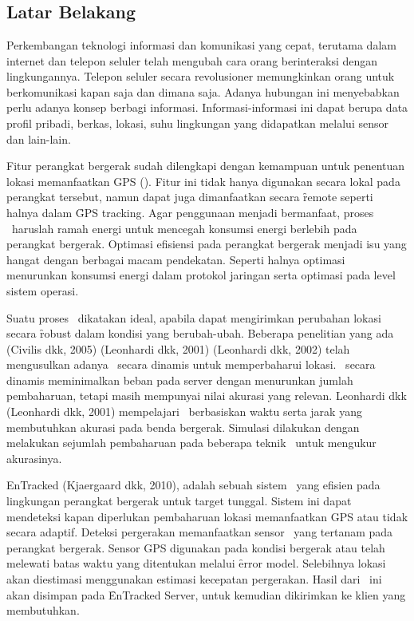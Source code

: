 \chapter{\babSatu}

\section{Latar Belakang}

Perkembangan teknologi informasi dan komunikasi yang cepat, terutama dalam
internet dan telepon seluler telah mengubah cara orang berinteraksi dengan
lingkungannya.  Telepon seluler secara revolusioner memungkinkan orang untuk
berkomunikasi kapan saja dan dimana saja. Adanya hubungan ini menyebabkan perlu
adanya konsep berbagi informasi. Informasi-informasi ini dapat berupa data
profil pribadi, berkas, lokasi, suhu lingkungan yang didapatkan melalui sensor
dan lain-lain.

Fitur perangkat bergerak sudah dilengkapi dengan kemampuan untuk penentuan
lokasi memanfaatkan GPS (\GPS).  Fitur ini tidak hanya digunakan secara lokal
pada perangkat tersebut, namun dapat juga dimanfaatkan secara \f{remote} seperti
halnya dalam \f{GPS tracking}. Agar penggunaan menjadi bermanfaat, proses
\tracking~haruslah ramah energi untuk mencegah konsumsi energi berlebih pada
perangkat bergerak. Optimasi efisiensi pada perangkat bergerak menjadi isu yang
hangat dengan berbagai macam pendekatan. Seperti halnya optimasi menurunkan
konsumsi energi dalam protokol jaringan serta optimasi pada level sistem
operasi.

Suatu proses \tracking~dikatakan ideal, apabila dapat mengirimkan perubahan
lokasi secara \f{robust} dalam kondisi yang berubah-ubah. Beberapa penelitian
yang ada (Civilis dkk, 2005) (Leonhardi dkk, 2001) (Leonhardi dkk, 2002) telah
mengusulkan adanya \tracking~secara dinamis untuk memperbaharui lokasi.
\tracking~secara dinamis meminimalkan beban pada server dengan menurunkan jumlah
pembaharuan, tetapi masih mempunyai nilai akurasi yang relevan.  Leonhardi dkk
(Leonhardi dkk, 2001) mempelajari \tracking~berbasiskan waktu serta jarak yang
membutuhkan akurasi pada benda bergerak. Simulasi dilakukan dengan melakukan
sejumlah pembaharuan pada beberapa teknik \tracking~untuk mengukur akurasinya.

EnTracked (Kjaergaard dkk, 2010), adalah sebuah sistem \tracking~yang efisien
pada lingkungan perangkat bergerak untuk target tunggal. Sistem ini dapat
mendeteksi kapan diperlukan pembaharuan lokasi memanfaatkan GPS atau tidak
secara adaptif. Deteksi pergerakan memanfaatkan sensor \acc~yang tertanam pada
perangkat bergerak. Sensor GPS digunakan pada kondisi bergerak atau telah
melewati batas waktu yang ditentukan melalui \f{error model}. Selebihnya lokasi
akan diestimasi menggunakan estimasi kecepatan pergerakan. Hasil dari
\tracking~ini akan disimpan pada \f{EnTracked Server}, untuk kemudian dikirimkan
ke klien yang membutuhkan.

